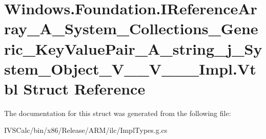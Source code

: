 \hypertarget{struct_windows_1_1_foundation_1_1_i_reference_array___a___system___collections___generic___key_v5a5240cea8f1d43fabceacbe948c907b}{}\section{Windows.\+Foundation.\+I\+Reference\+Array\+\_\+\+A\+\_\+\+System\+\_\+\+Collections\+\_\+\+Generic\+\_\+\+Key\+Value\+Pair\+\_\+\+A\+\_\+string\+\_\+j\+\_\+\+System\+\_\+\+Object\+\_\+\+V\+\_\+\+\_\+\+V\+\_\+\+\_\+\+\_\+\+Impl.\+Vtbl Struct Reference}
\label{struct_windows_1_1_foundation_1_1_i_reference_array___a___system___collections___generic___key_v5a5240cea8f1d43fabceacbe948c907b}


The documentation for this struct was generated from the following file\+:\begin{DoxyCompactItemize}
\item 
I\+V\+S\+Calc/bin/x86/\+Release/\+A\+R\+M/ilc/Impl\+Types.\+g.\+cs\end{DoxyCompactItemize}
